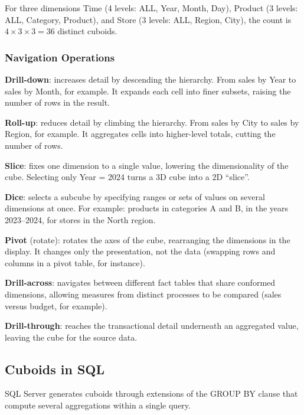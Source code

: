 For three dimensions Time (4 levels: ALL, Year, Month, Day), Product (3 levels: ALL, Category, Product), and Store (3 levels: ALL, Region, City), the count is $4 \times 3 \times 3 = 36$ distinct cuboids.

\subsubsection{Navigation Operations}
\label{subsec:olap-operations}

\begin{notebox}
\textbf{Drill-down}: increases detail by descending the hierarchy. From sales by Year to sales by Month, for example. It expands each cell into finer subsets, raising the number of rows in the result.

\textbf{Roll-up}: reduces detail by climbing the hierarchy. From sales by City to sales by Region, for example. It aggregates cells into higher-level totals, cutting the number of rows.

\textbf{Slice}: fixes one dimension to a single value, lowering the dimensionality of the cube. Selecting only Year = 2024 turns a 3D cube into a 2D ``slice''.

\textbf{Dice}: selects a subcube by specifying ranges or sets of values on several dimensions at once. For example: products in categories A and B, in the years 2023--2024, for stores in the North region.

\textbf{Pivot} (rotate): rotates the axes of the cube, rearranging the dimensions in the display. It changes only the presentation, not the data (swapping rows and columns in a pivot table, for instance).

\textbf{Drill-across}: navigates between different fact tables that share conformed dimensions, allowing measures from distinct processes to be compared (sales versus budget, for example).

\textbf{Drill-through}: reaches the transactional detail underneath an aggregated value, leaving the cube for the source data.
\end{notebox}

\subsection{Cuboids in SQL}
\label{sec:sql-cubes}

SQL Server generates cuboids through extensions of the GROUP BY clause that compute several aggregations within a single query.

